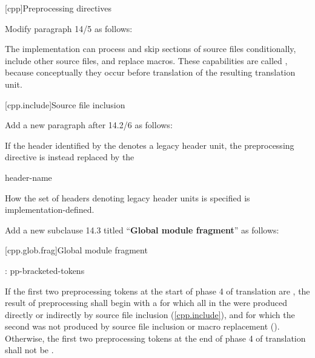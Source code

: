 \setcounter{chapter}{13}
[cpp]{Preprocessing directives}%

\begin{after}
Modify paragraph 14/5 as follows:

\begin{std.txt}
\resetalinea[4]
\alinea
The implementation can
process and skip sections of source files conditionally,
include other source files,
and replace macros.
These capabilities are called
,
because conceptually they occur
before translation of the resulting translation unit.
\end{std.txt}
\end{after}

\setcounter{section}{1}
[cpp.include]{Source file inclusion}%

\begin{after}
Add a new paragraph after 14.2/6 as follows:

\begin{std.txt}
\resetalinea[6]
\color{addclr}
\alinea
If the header identified by the 
denotes a legacy header unit, the preprocessing directive
is instead replaced by the 

\begin{bnf}
 header-name \terminal{;}
\end{bnf}

\color{addclr}
How the set of headers denoting legacy header units is specified
is implementation-defined.
\end{std.txt}
\end{after}

\noindent
Add a new subclause 14.3 titled ``\textbf{Global module fragment}'' as follows:

\setcounter{section}{2}
[cpp.glob.frag]{Global module fragment}%
\resetalinea[0]

\begin{std.txt}
\color{addclr}
\begin{bnf}
:\br
   \terminal{;} pp-bracketed-tokens 
\end{bnf}

\alinea
If the first two preprocessing tokens at the start of phase 4 of translation
are  \tcode{;}, the result of preprocessing shall begin with
a  for which all
 in the 
were produced directly or indirectly by source file inclusion
(\ref{cpp.include}), and for which the second 
 was not produced by source file inclusion or
macro replacement ().
Otherwise, the first two preprocessing tokens at the end of phase 4 of
translation shall not be  \tcode{;}.
\end{std.txt}

